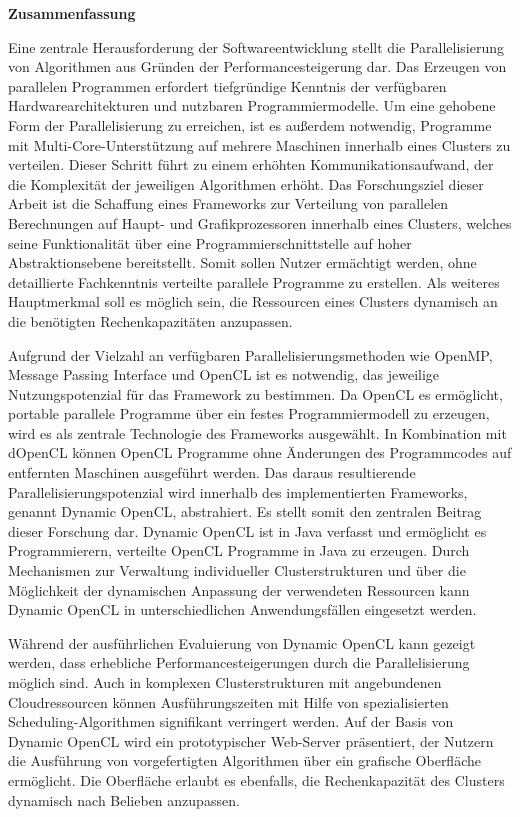 \thispagestyle{empty}
\begin{center}\textsf{\textbf{Zusammenfassung}}\end{center}

\noindent Eine zentrale Herausforderung der Softwareentwicklung stellt die Parallelisierung von Algorithmen aus Gründen der Performancesteigerung dar. Das Erzeugen von parallelen Programmen erfordert tiefgründige Kenntnis der verfügbaren Hardwarearchitekturen und nutzbaren Programmiermodelle. Um eine gehobene Form der Parallelisierung zu erreichen, ist es außerdem notwendig, Programme mit Multi-Core-Unterstützung auf mehrere Maschinen innerhalb eines Clusters zu verteilen. Dieser Schritt führt zu einem erhöhten Kommunikationsaufwand, der die Komplexität der jeweiligen Algorithmen erhöht. Das Forschungsziel dieser Arbeit ist die Schaffung eines Frameworks zur Verteilung von parallelen Berechnungen auf Haupt- und Grafikprozessoren innerhalb eines Clusters, welches seine Funktionalität über eine Programmierschnittstelle auf hoher Abstraktionsebene bereitstellt. Somit sollen Nutzer ermächtigt werden, ohne detaillierte Fachkenntnis verteilte parallele Programme zu erstellen. Als weiteres Hauptmerkmal soll es möglich sein, die Ressourcen eines Clusters dynamisch an die benötigten Rechenkapazitäten anzupassen.

Aufgrund der Vielzahl an verfügbaren Parallelisierungsmethoden wie OpenMP, Message Passing Interface und OpenCL ist es notwendig, das jeweilige Nutzungspotenzial für das Framework zu bestimmen. Da OpenCL es ermöglicht, portable parallele Programme über ein festes Programmiermodell zu erzeugen, wird es als zentrale Technologie des Frameworks ausgewählt. In Kombination mit dOpenCL können OpenCL Programme ohne Änderungen des Programmcodes auf entfernten Maschinen ausgeführt werden. Das daraus resultierende Parallelisierungspotenzial wird innerhalb des implementierten Frameworks, genannt Dynamic OpenCL, abstrahiert. Es stellt somit den zentralen Beitrag dieser Forschung dar. Dynamic OpenCL ist in Java verfasst und ermöglicht es Programmierern, verteilte OpenCL Programme in Java zu erzeugen. Durch Mechanismen zur Verwaltung individueller Clusterstrukturen und über die Möglichkeit der dynamischen Anpassung der verwendeten Ressourcen kann Dynamic OpenCL in unterschiedlichen Anwendungsfällen eingesetzt werden.

Während der ausführlichen Evaluierung von Dynamic OpenCL kann gezeigt werden, dass erhebliche Performancesteigerungen durch die Parallelisierung möglich sind. Auch in komplexen Clusterstrukturen mit angebundenen Cloudressourcen können Ausführungszeiten mit Hilfe von spezialisierten Scheduling-Algorithmen signifikant verringert werden. Auf der Basis von Dynamic OpenCL wird ein prototypischer Web-Server präsentiert, der Nutzern die Ausführung von vorgefertigten Algorithmen über ein grafische Oberfläche ermöglicht. Die Oberfläche erlaubt es ebenfalls, die Rechenkapazität des Clusters dynamisch nach Belieben anzupassen.

